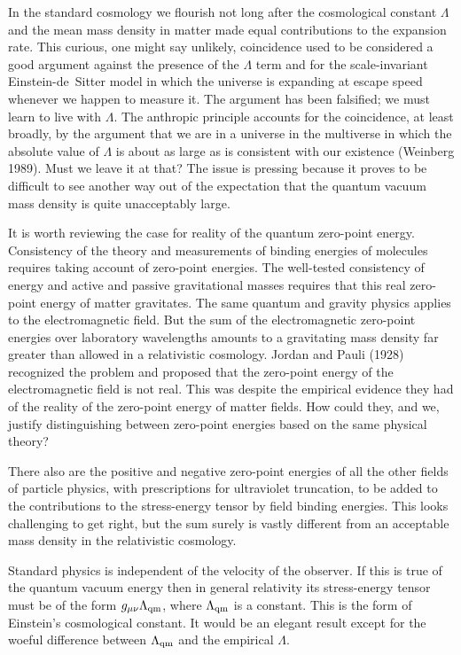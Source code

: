 \documentclass[fleqn,12pt]{article}
\begin{document}
In the standard cosmology we flourish not long after the cosmological constant $\Lambda$ and the mean mass density in matter made equal contributions to the expansion rate. This curious, one might say unlikely, coincidence used to be considered a good argument against the presence of the $\Lambda$ term and for the scale-invariant Einstein-de~Sitter model in which the universe is expanding at escape speed whenever we happen to measure it. The argument has been falsified; we must learn to live with $\Lambda$. The anthropic principle accounts for the coincidence, at least broadly, by the argument that we are in a universe in the multiverse in which the absolute value of $\Lambda$ is about as large as is consistent with our existence (Weinberg 1989). Must we leave it at that? The issue is pressing because it proves to be difficult to see another way out of the expectation that the quantum vacuum mass density is quite unacceptably large.

It is worth reviewing the case for reality of the quantum zero-point energy. Consistency of the theory and measurements of binding energies of molecules requires taking account of zero-point energies. The well-tested consistency of energy and active and passive gravitational masses requires that this real zero-point energy of  matter gravitates. The same quantum and gravity physics applies to the electromagnetic field. But the sum of the electromagnetic zero-point energies over laboratory wavelengths amounts to a gravitating mass density far greater than allowed in a relativistic cosmology. Jordan and Pauli (1928) recognized the problem and proposed that the zero-point energy of the electromagnetic field is not real. This was despite the empirical evidence they had of the reality of the zero-point energy of matter fields. How could they, and we, justify distinguishing between zero-point energies based on the same physical theory? 

There also are the positive and negative zero-point energies of all the other fields of particle physics, with prescriptions for ultraviolet truncation, to be added to the contributions to the stress-energy tensor by field binding energies. This looks  challenging to get right, but the sum surely is vastly different from an acceptable mass density in the relativistic cosmology.

Standard physics is independent of the velocity of the observer. If this is true of the quantum vacuum energy then in general relativity its stress-energy tensor must be of the form $g_{\mu\nu}\Lambda_{\rm qm}$, where $\Lambda_{\rm qm}$ is a constant. This is the form of Einstein's cosmological constant. It would be an elegant result except for the woeful difference between $\Lambda_{\rm qm}$ and the empirical $\Lambda$. 
\end{document}
